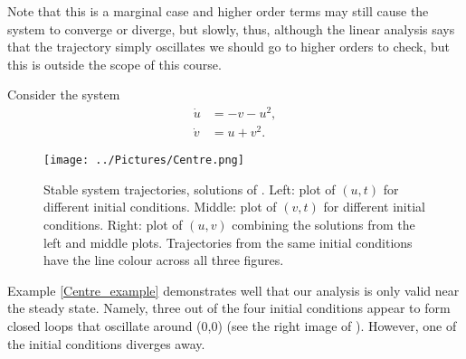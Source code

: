 Note that this is a marginal case and higher order terms may still cause the system to converge or diverge, but slowly, thus, although the linear analysis says that the trajectory simply oscillates we should go to higher orders to check, but this is outside the scope of this course.
\begin{example}[frametitle=Centre point]\label{Centre_example}
Consider the system
\begin{align}
\dot{u}&=-v-u^2,\label{Centre_1}\\
\dot{v}&=u+v^2\label{Centre_2}.
\end{align}
\end{example}
\begin{figure}[!!!h!!!tb]
\centering
\texttt{[image: ../Pictures/Centre.png]}
\caption{\label{Centre}Stable system trajectories, solutions of . Left: plot of $(u,t)$ for different initial conditions. Middle: plot of $(v,t)$ for different initial conditions. Right: plot of $(u,v)$ combining the solutions from the left and middle plots. Trajectories from the same initial conditions have the line colour across all three figures.}
\end{figure}
Example \ref{Centre_example} demonstrates well that our analysis is only valid near the steady state. Namely, three out of the four initial conditions appear to form closed loops that oscillate around (0,0) (see the right image of ). However, one of the initial conditions diverges away.



